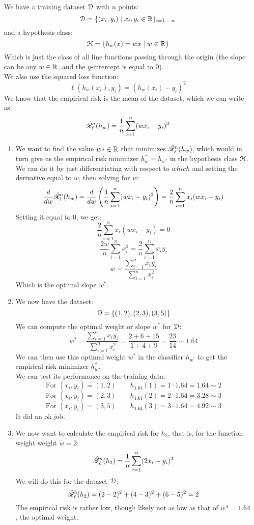 \documentclass[12pt]{article}
\begin{document}
We have a training dataset $\mathcal{D}$ 
with $n$ points:
\[ \mathcal{D} = \{(x_i, y_i) \mid 
x_i, y_i \in \mathbb{R} \}_{i = 1, \dots n} \]
and a hypothesis class:
\[ \mathcal{H} = \{ h_{w}(x) = wx \mid w \in \mathbb{R} \} \]
Which is just the class of all line
functions passing through the origin
(the slope can be any $w \in \mathbb{R}$,
and the $y$-intercept is equal to $0$). \\
We also use the squared loss function:
\[ \ell(h_w(x_i), y_i) = (h_w(x_i) - y_i)^2 \]
We know that the empirical risk
is the mean of the dataset,
which we can write as:
\[ \hat{\mathscr{R}}_\ell^n(h_w)
= \dfrac{1}{n}\sum_{i = 1}^{n}(wx_i - y_i)^2 \]
\begin{enumerate}[label = \alph*)]
\item 
We want to find the value $w* \in \mathbb{R}$
that minimizes $\hat{\mathscr{R}}_\ell^n(h_w)$,
which would in turn give us the
empirical risk minimizer $h_w^* = h_{w^*}$
in the hypothesis class $\mathcal{H}$. \\
We can do it by just differentiating
with respect to $which$ and setting the derivative
equal to $w$,
then solving for $w$:
\[ \dfrac{d}{dw}\hat{\mathscr{R}}_\ell^n(h_w)
= \dfrac{d}{dw}\left( \dfrac{1}{n}\sum_{i = 1}^{n}
(wx_i - y_i)^2 \right) 
= \dfrac{2}{n}\sum_{i = 1}^{n}x_i(wx_i - y_i) \]
Setting it equal to $0$, we get:
\[ \dfrac{2}{n}\sum_{i = 1}^{n}x_i(wx_i - y_i) = 0 \]
\[ \dfrac{2w}{n}\sum_{i = 1}^{n}x_i^2 
= \dfrac{2}{n}\sum_{i = 1}^{n} x_iy_i \]
\[ w = \dfrac{\sum_{i = 1}^{n}x_iy_i}
{\sum_{i = 1}^{n} x_i^2} \]
Which is the optimal slope $w^*$.
\item
We now have the dataset:
\[ \mathcal{D} = \{ (1, 2), (2, 3), (3, 5)\} \]
We can compute the optimal weight or slope $w^*$
for $\mathcal{D}$:
\[ w^* = \dfrac{\sum_{i = 1}^{n}x_iy_i}
{\sum_{i = 1}^{n} x_i^2}
= \dfrac{2 + 6 + 15}
{1 + 4 + 9} = \dfrac{23}{14} \sim 1.64 \]
We can then use this optimal weight $w^*$
in the classifier $h_{w^*}$
to get the empirical risk minimizer $h_w^*$. \\
We can test its performance on the training
data:
\[ \text{For } (x_i, y_i) = (1, 2) \qquad
h_{1.64}(1) = 1 \cdot 1.64 = 1.64 \sim 2 \]
\[ \text{For } (x_i, y_i) = (2, 3) \qquad
h_{1.64}(2) = 2 \cdot 1.64 = 3.28  \sim 3 \]
\[ \text{For } (x_i, y_i) = (3, 5) \qquad
h_{1.64}(3) = 3 \cdot 1.64 = 4.92  \sim 3 \]
It did an ok job.
\item
We now want to calculate the empirical
risk for $h_{2}$,
that is, for the function weight weight 
$\tilde{w} = 2$:
\[ \hat{\mathscr{R}}_\ell^n(h_2)
= \dfrac{1}{n}\sum_{i = 1}^{n}(2x_i - y_i)^2 \]
We will do this for the dataset $\mathcal{D}$:
\[ \hat{\mathscr{R}}_\ell^3(h_2)
= (2-2)^2 + (4-3)^2 + (6-5)^2 = 2 \]
The empirical risk is rather low,
though likely not as low as that of $w* = 1.64$,
the optimal weight. \\
\end{enumerate}
\end{document}
